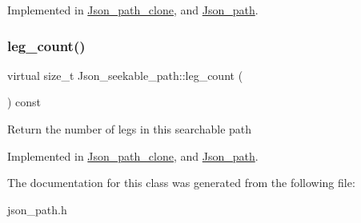 Implemented in \mbox{\hyperlink{classJson__path__clone_afc7f1eee2eb7e50ab90c0a52dd2e7fa4}{Json\+\_\+path\+\_\+clone}}, and \mbox{\hyperlink{classJson__path_a33038f8cae772c5f4c8333be94389b46}{Json\+\_\+path}}.

\mbox{\label{classJson__seekable__path_aa268c1af2eec01b70924509a23b8db59}} 
\subsubsection{\texorpdfstring{leg\+\_\+count()}{leg\_count()}}
{\footnotesize\ttfamily virtual size\+\_\+t Json\+\_\+seekable\+\_\+path\+::leg\+\_\+count (\begin{DoxyParamCaption}{ }\end{DoxyParamCaption}) const\hspace{0.3cm}{\ttfamily [pure virtual]}}

Return the number of legs in this searchable path 

Implemented in \mbox{\hyperlink{classJson__path__clone_a7b3217b45baaa958cc2a48a1e03bbe31}{Json\+\_\+path\+\_\+clone}}, and \mbox{\hyperlink{classJson__path_a22b4d53c90300f917ab7abaedad8bfaa}{Json\+\_\+path}}.



The documentation for this class was generated from the following file\+:\begin{DoxyCompactItemize}
\item 
json\+\_\+path.\+h\end{DoxyCompactItemize}
